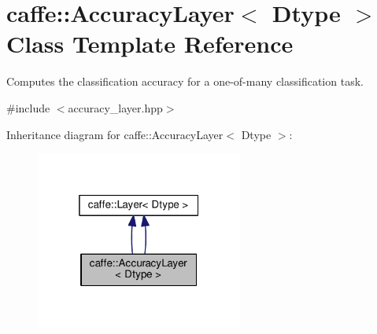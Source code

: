 \hypertarget{classcaffe_1_1_accuracy_layer}{}\section{caffe\+:\+:Accuracy\+Layer$<$ Dtype $>$ Class Template Reference}
\label{classcaffe_1_1_accuracy_layer}


Computes the classification accuracy for a one-\/of-\/many classification task.  




{\ttfamily \#include $<$accuracy\+\_\+layer.\+hpp$>$}



Inheritance diagram for caffe\+:\+:Accuracy\+Layer$<$ Dtype $>$\+:
\nopagebreak
\begin{figure}[H]
\begin{center}
\leavevmode
\includegraphics[width=193pt]{classcaffe_1_1_accuracy_layer__inherit__graph}
\end{center}
\end{figure}
